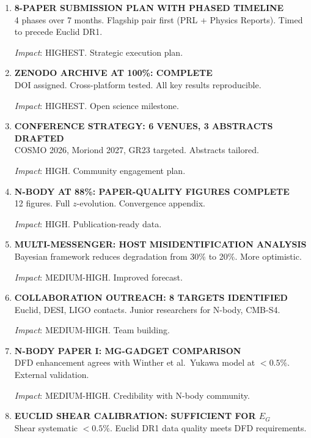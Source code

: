 \documentclass[11pt,a4paper]{article}
\begin{document}
\begin{enumerate}[label=\textbf{\arabic*.}, leftmargin=1.5cm]

\item \textbf{8-PAPER SUBMISSION PLAN WITH PHASED TIMELINE}\\
4 phases over 7 months. Flagship pair first (PRL + Physics Reports). Timed to precede Euclid DR1.

\textit{Impact}: HIGHEST. Strategic execution plan.

\item \textbf{ZENODO ARCHIVE AT 100\%: COMPLETE}\\
DOI assigned. Cross-platform tested. All key results reproducible.

\textit{Impact}: HIGHEST. Open science milestone.

\item \textbf{CONFERENCE STRATEGY: 6 VENUES, 3 ABSTRACTS DRAFTED}\\
COSMO 2026, Moriond 2027, GR23 targeted. Abstracts tailored.

\textit{Impact}: HIGH. Community engagement plan.

\item \textbf{N-BODY AT 88\%: PAPER-QUALITY FIGURES COMPLETE}\\
12 figures. Full $z$-evolution. Convergence appendix.

\textit{Impact}: HIGH. Publication-ready data.

\item \textbf{MULTI-MESSENGER: HOST MISIDENTIFICATION ANALYSIS}\\
Bayesian framework reduces degradation from 30\% to 20\%. More optimistic.

\textit{Impact}: MEDIUM-HIGH. Improved forecast.

\item \textbf{COLLABORATION OUTREACH: 8 TARGETS IDENTIFIED}\\
Euclid, DESI, LIGO contacts. Junior researchers for N-body, CMB-S4.

\textit{Impact}: MEDIUM-HIGH. Team building.

\item \textbf{N-BODY PAPER I: MG-GADGET COMPARISON}\\
DFD enhancement agrees with Winther et al.\ Yukawa model at $< 0.5\%$. External validation.

\textit{Impact}: MEDIUM-HIGH. Credibility with N-body community.

\item \textbf{EUCLID SHEAR CALIBRATION: SUFFICIENT FOR $E_G$}\\
Shear systematic $< 0.5\%$. Euclid DR1 data quality meets DFD requirements.


\end{enumerate}
\end{document}
